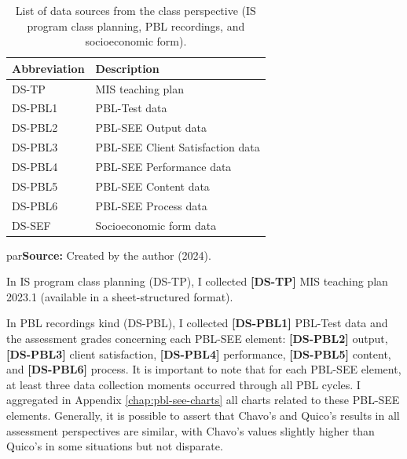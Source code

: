 \begin{table}[htb]
\caption{List of data sources from the class perspective (\acrshort{IS} program class planning, \acrshort{PBL} recordings, and socioeconomic form).}
\label{tbl:class-data-sources}
\centering
{}
\begin{tabular}{
    >{\centering\arraybackslash}m{3cm}|
    >{\centering\arraybackslash}m{7cm}
}
    \hline
    \textbf{Abbreviation} &
    \textbf{Description} \\
    
    \hline
    \acrshort{DS-TP} &
    \acrshort{MIS} teaching plan \\
    
    \hline
    \acrshort{DS-PBL}1 &
    \acrshort{PBL}-Test data \\
    
    \acrshort{DS-PBL}2 &
    \acrshort{PBL-SEE} Output data \\

    \acrshort{DS-PBL}3 &
    \acrshort{PBL-SEE} Client Satisfaction data \\

    \acrshort{DS-PBL}4 &
    \acrshort{PBL-SEE} Performance data\\

    \acrshort{DS-PBL}5 &
    \acrshort{PBL-SEE} Content data\\

    \acrshort{DS-PBL}6 &
    \acrshort{PBL-SEE} Process data\\

    \hline
    \acrshort{DS-SEF} &
    Socioeconomic form data\\
    
    \hline
    
\end{tabular}

par\medskip\ABNTEXfontereduzida\selectfont\textbf{Source:} Created by the author (2024). \par\medskip

\end{table}

In \gls{IS} program class planning (\acrfull{DS-TP}), I collected \textbf{[DS-TP]} \gls{MIS} teaching plan 2023.1 (available in a sheet-structured format).

In \gls{PBL} recordings kind (\acrfull{DS-PBL}), I collected \textbf{[DS-PBL1]} \gls{PBL}-Test data and the assessment grades concerning each \gls{PBL-SEE} element: \textbf{[DS-PBL2]} output, \textbf{[DS-PBL3]} client satisfaction, \textbf{[DS-PBL4]} performance, \textbf{[DS-PBL5]} content, and \textbf{[DS-PBL6]} process. It is important to note that for each \gls{PBL-SEE} element, at least three data collection moments occurred through all \gls{PBL} cycles. I aggregated in Appendix \ref{chap:pbl-see-charts} all charts related to these \gls{PBL-SEE} elements. Generally, it is possible to assert that Chavo's and Quico's results in all assessment perspectives are similar, with Chavo's values slightly higher than Quico's in some situations but not disparate.

